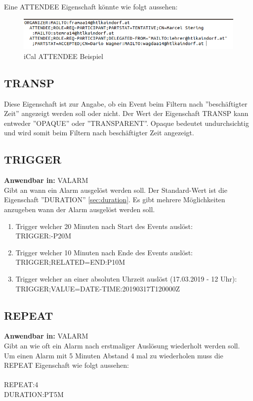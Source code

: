 Eine ATTENDEE Eigenschaft könnte wie folgt aussehen: \\
\begin{figure}[h]
	\centering
    \includegraphics[width=\textwidth]{images/iCal_Format_attendee}
    \caption{iCal ATTENDEE Beispiel}
    \label{fig:netFramework}
\end{figure}
\subsection{TRANSP}
\label{sec:transp}
Diese Eigenschaft ist zur Angabe, ob ein Event beim Filtern nach ''beschäftigter Zeit'' angezeigt werden soll oder nicht. Der Wert der Eigenschaft TRANSP kann entweder ''OPAQUE'' oder ''TRANSPARENT''. Opaque bedeutet undurchsichtig und wird somit beim Filtern nach beschäftigter Zeit angezeigt.
\subsection{TRIGGER}
\label{sec:trigger}
\textbf{Anwendbar in:} VALARM \\
Gibt an wann ein Alarm ausgelöst werden soll. Der Standard-Wert ist die Eigenschaft ''DURATION'' \ref{sec:duration}. Es gibt mehrere Möglichkeiten anzugeben wann der Alarm ausgelöst werden soll. 
\begin{enumerate}
\item Trigger welcher 20 Minuten nach Start des Events auslöst: \\TRIGGER:-P20M\\
\item Trigger welcher 10 Minuten nach Ende des Events auslöst: \\TRIGGER;RELATED=END:P10M\\
\item Trigger welcher an einer absoluten Uhrzeit auslöst (17.03.2019 - 12 Uhr): \\TRIGGER;VALUE=DATE-TIME:20190317T120000Z\\
\end{enumerate}
\subsection{REPEAT}
\label{sec:repeat}
\textbf{Anwendbar in:} VALARM \\
Gibt an wie oft ein Alarm nach erstmaliger Auslösung wiederholt werden soll. Um einen Alarm mit 5 Minuten Abstand 4 mal zu wiederholen muss die REPEAT Eigenschaft wie folgt aussehen: \\ \\ REPEAT:4\\DURATION:PT5M
\renewcommand{\theauthor}{Dario Wagner}
